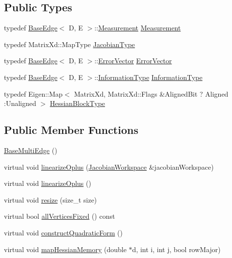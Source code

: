 \subsection*{Public Types}
\begin{DoxyCompactItemize}
\item 
typedef \mbox{\hyperlink{classg2o_1_1_base_edge}{Base\+Edge}}$<$ D, E $>$\+::\mbox{\hyperlink{classg2o_1_1_base_edge_a2c148abba650a20b8c7eed75d3e2211e}{Measurement}} \mbox{\hyperlink{classg2o_1_1_base_multi_edge_acbaff4c018fb314db5c7852054ffb89d}{Measurement}}
\item 
typedef Matrix\+Xd\+::\+Map\+Type \mbox{\hyperlink{classg2o_1_1_base_multi_edge_a43dfdf5b27df296a32ee5a11f0653d55}{Jacobian\+Type}}
\item 
typedef \mbox{\hyperlink{classg2o_1_1_base_edge}{Base\+Edge}}$<$ D, E $>$\+::\mbox{\hyperlink{classg2o_1_1_base_edge_af5b558dd24e4be2e437563cae4b3550d}{Error\+Vector}} \mbox{\hyperlink{classg2o_1_1_base_multi_edge_ae17c6b5747bfed295214942207a6eb74}{Error\+Vector}}
\item 
typedef \mbox{\hyperlink{classg2o_1_1_base_edge}{Base\+Edge}}$<$ D, E $>$\+::\mbox{\hyperlink{classg2o_1_1_base_edge_a2e5a33343ac3f189d8a7d5ee4d8b73fc}{Information\+Type}} \mbox{\hyperlink{classg2o_1_1_base_multi_edge_a368ab136a2cee049549cb479fb4c88fa}{Information\+Type}}
\item 
typedef Eigen\+::\+Map$<$ Matrix\+Xd, Matrix\+Xd\+::\+Flags \&Aligned\+Bit ? Aligned \+:Unaligned $>$ \mbox{\hyperlink{classg2o_1_1_base_multi_edge_af299cc8f77d917c1ad4a7d8004aec3a1}{Hessian\+Block\+Type}}
\end{DoxyCompactItemize}
\subsection*{Public Member Functions}
\begin{DoxyCompactItemize}
\item 
\mbox{\hyperlink{classg2o_1_1_base_multi_edge_a761d6a3623ed2c4ce6c6535f78dac08d}{Base\+Multi\+Edge}} ()
\item 
virtual void \mbox{\hyperlink{classg2o_1_1_base_multi_edge_a72176776797987b8ae79ea2e33971e9e}{linearize\+Oplus}} (\mbox{\hyperlink{classg2o_1_1_jacobian_workspace}{Jacobian\+Workspace}} \&jacobian\+Workspace)
\item 
virtual void \mbox{\hyperlink{classg2o_1_1_base_multi_edge_a6196a4cd1ddc2ef27c1474252bb60e9f}{linearize\+Oplus}} ()
\item 
virtual void \mbox{\hyperlink{classg2o_1_1_base_multi_edge_ae07ec9359cd515d0abc2100ee8aae93f}{resize}} (size\+\_\+t size)
\item 
virtual bool \mbox{\hyperlink{classg2o_1_1_base_multi_edge_a6e665877bd472839872077f5cc1ff2ec}{all\+Vertices\+Fixed}} () const
\item 
virtual void \mbox{\hyperlink{classg2o_1_1_base_multi_edge_ae44ba0385d4dda4bc038d81e50cadd8c}{construct\+Quadratic\+Form}} ()
\item 
virtual void \mbox{\hyperlink{classg2o_1_1_base_multi_edge_aecded66022b967fab0deb1c6a2d76445}{map\+Hessian\+Memory}} (double $\ast$d, int i, int j, bool row\+Major)
\end{DoxyCompactItemize}
